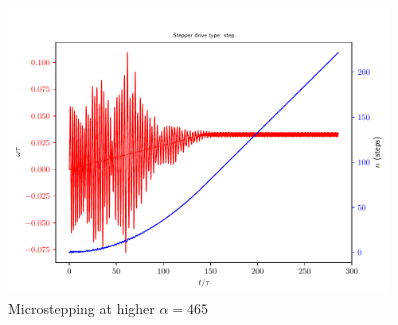\documentclass{article}
\begin{document}
\begin{figure}[h!]
  \centering
  \includegraphics[width=0.9\textwidth]{simfigs/fig1-2018-10-20T14-29-43-step-alpha-465.pdf}
  \captionsetup{justification=centering}
  \caption{Microstepping at higher $\alpha=465$}
   \label{fig:step-alpha-465}
\end{figure}
\end{document}

